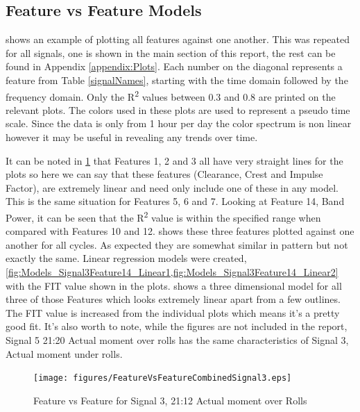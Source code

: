\documentclass[]{article}
\begin{document}
\subsection{Feature vs Feature Models}
 shows an example of plotting all features against one another. This was repeated for all signals, one is shown in the main section of this report, the rest can be found in Appendix \ref{appendix:Plots}. Each number on the diagonal represents a feature from Table \ref{signalNames}, starting with the time domain followed by the frequency domain. Only the R\textsuperscript{2} values between 0.3 and 0.8 are printed on the relevant plots. The colors used in these plots are used to represent a pseudo time scale. Since the data is only from 1 hour per day the color spectrum is non linear however it may be useful in revealing any trends over time.

It can be noted in \cref{fig:FeatureVsFeatureCombinedSignal3} that Features 1, 2 and 3 all have very straight lines for the plots so here we can say that these features (Clearance, Crest and Impulse Factor), are extremely linear and need only include one of these in any model. This is the same situation for Features 5, 6 and 7.
Looking at Feature 14, Band Power, it can be seen that the R\textsuperscript{2} value is within the specified range when compared with Features 10 and 12.  shows these three features plotted against one another for all cycles. As expected they are somewhat similar in pattern but not exactly the same. Linear regression models were created, \cref{fig:Models_Signal3Feature14_Linear1,fig:Models_Signal3Feature14_Linear2} with the FIT value shown in the plots.  shows a three dimensional model for all three of those Features which looks extremely linear apart from a few outlines. The FIT value is increased from the individual plots which means it's a pretty good fit. It's also worth to note, while the figures are not included in the report, Signal 5 21:20 Actual moment over rolls has the same characteristics of Signal 3, Actual moment under rolls.

\begin{figure}[H]
    \centering
    \texttt{[image: figures/FeatureVsFeatureCombinedSignal3.eps]}
    \caption{Feature vs Feature for Signal 3, 21:12 Actual moment over Rolls}
    \label{fig:FeatureVsFeatureCombinedSignal3}
\end{figure}
\end{document}
